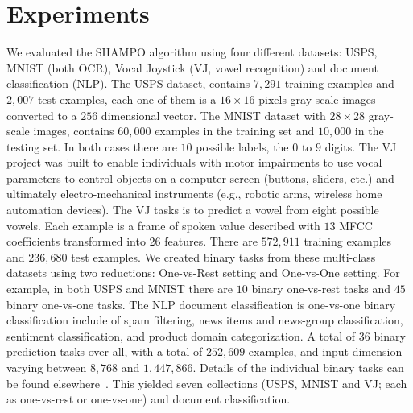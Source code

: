 \chapter{Experiments}





We evaluated the SHAMPO algorithm using four different datasets: USPS, MNIST (both OCR), Vocal Joystick 
(VJ, vowel recognition) and document classification (NLP). 
The USPS dataset, contains $7,291$ training examples and $2,007$ test examples, each one of them is a 
$16\times16$ pixels gray-scale images converted to a $256$ dimensional vector. 
The MNIST dataset with $28\times28$ gray-scale images, contains $60,000$ 
examples in the training set and $10,000$ in the testing set. In both cases there are $10$ possible labels,
the $0$ to $9$ digits. The VJ project was built to enable individuals with motor impairments to use vocal
 parameters to control objects on a computer screen (buttons, sliders, etc.) and ultimately 
 electro-mechanical instruments (e.g., robotic arms, wireless home automation devices). The VJ tasks is to 
 predict a vowel from eight possible vowels. Each example is a frame of spoken value described with $13$ 
 MFCC coefficients transformed into 26 features. There are $572,911$ training examples and $236,680$ test 
 examples. We created binary tasks from these multi-class datasets using two reductions: One-vs-Rest 
 setting and One-vs-One setting. For example, in both USPS and MNIST there are $10$ binary one-vs-rest 
 tasks and $45$ binary one-vs-one tasks.  The NLP document classification is one-vs-one  binary 
 classification include of spam filtering, news items and news-group classification, sentiment classification, 
 and product domain categorization. A total of $36$ binary prediction tasks over all, with a total of 
 $252,609$ examples, and input dimension varying between $8,768$ and $1,447,866$. 
 Details of the individual binary tasks can be found elsewhere~\cite{Crammer:2012:CLC:2343676.2343704}.
This yielded seven collections (USPS, MNIST and VJ; each as one-vs-rest or one-vs-one) and document 
classification.


